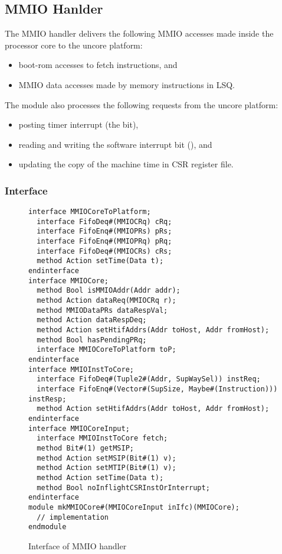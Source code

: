 \subsection{MMIO Hanlder}\label{sec:mmio-core}

The MMIO handler delivers the following MMIO accesses made inside the processor core to the uncore platform:
\begin{itemize}
    \item boot-rom accesses to fetch instructions, and
    \item MMIO data accesses made by memory instructions in LSQ.
\end{itemize}
The module also processes the following requests from the uncore platform:
\begin{itemize}
    \item posting timer interrupt (the  bit),
    \item reading and writing the software interrupt bit (), and
    \item updating the copy of the machine time in CSR register file.
\end{itemize}

\subsubsection{Interface}

\begin{figure}
\begin{lstlisting}[caption={}]
interface MMIOCoreToPlatform;
  interface FifoDeq#(MMIOCRq) cRq;
  interface FifoEnq#(MMIOPRs) pRs;
  interface FifoEnq#(MMIOPRq) pRq;
  interface FifoDeq#(MMIOCRs) cRs;
  method Action setTime(Data t);
endinterface
interface MMIOCore;
  method Bool isMMIOAddr(Addr addr);
  method Action dataReq(MMIOCRq r);
  method MMIODataPRs dataRespVal;
  method Action dataRespDeq;
  method Action setHtifAddrs(Addr toHost, Addr fromHost);
  method Bool hasPendingPRq;
  interface MMIOCoreToPlatform toP;
endinterface
interface MMIOInstToCore;
  interface FifoDeq#(Tuple2#(Addr, SupWaySel)) instReq;
  interface FifoEnq#(Vector#(SupSize, Maybe#(Instruction))) instResp;
  method Action setHtifAddrs(Addr toHost, Addr fromHost);
endinterface
interface MMIOCoreInput;
  interface MMIOInstToCore fetch;
  method Bit#(1) getMSIP;
  method Action setMSIP(Bit#(1) v);
  method Action setMTIP(Bit#(1) v);
  method Action setTime(Data t);
  method Bool noInflightCSRInstOrInterrupt;
endinterface
module mkMMIOCore#(MMIOCoreInput inIfc)(MMIOCore);
  // implementation
endmodule
\end{lstlisting}
\caption{Interface of MMIO handler}\label{fig:mmio-core-ifc}
\end{figure}

